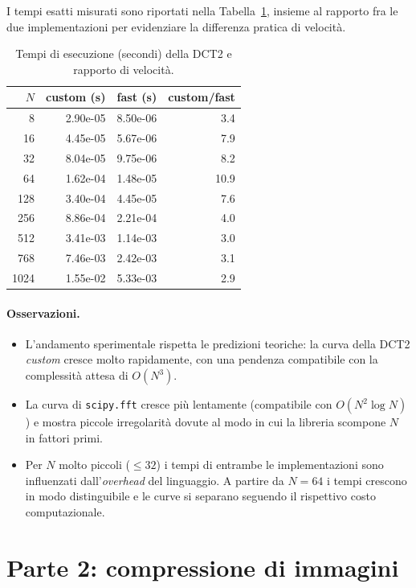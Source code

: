 \documentclass[11pt,a4paper]{article}
\makeatletter
\let\@origtexttt\texttt
\renewcommand{\texttt}[1]{{\def\_{\textunderscore\discretionary{}{}{}}\@origtexttt{#1}}}
\makeatother
\begin{document}
I tempi esatti misurati sono riportati nella Tabella~\ref{tab:tempi}, insieme al
rapporto fra le due implementazioni per evidenziare la differenza pratica di velocità.

\begin{table}[H]
\centering
\caption{Tempi di esecuzione (secondi) della DCT2 e rapporto di velocità.}
\label{tab:tempi}
\begin{tabular}{rrrr}
\toprule
$N$ & custom (s) & fast (s) & custom/fast \\
\midrule
8    & 2.90e-05 & 8.50e-06 & 3.4  \\
16   & 4.45e-05 & 5.67e-06 & 7.9  \\
32   & 8.04e-05 & 9.75e-06 & 8.2  \\
64   & 1.62e-04 & 1.48e-05 & 10.9 \\
128  & 3.40e-04 & 4.45e-05 & 7.6  \\
256  & 8.86e-04 & 2.21e-04 & 4.0  \\
512  & 3.41e-03 & 1.14e-03 & 3.0  \\
768  & 7.46e-03 & 2.42e-03 & 3.1  \\
1024 & 1.55e-02 & 5.33e-03 & 2.9  \\
\bottomrule
\end{tabular}
\end{table}

\paragraph{Osservazioni.}
\begin{itemize}
  \item L'andamento sperimentale rispetta le predizioni teoriche: la curva
        della DCT2 \emph{custom} cresce molto rapidamente, con una pendenza compatibile con la complessità attesa di $O(N^3)$.
  \item La curva di \texttt{scipy.fft} cresce più lentamente (compatibile con
        $O(N^2\log N)$) e mostra piccole irregolarità dovute al modo in cui la libreria scompone $N$ in fattori primi.
  \item Per $N$ molto piccoli ($\le 32$) i tempi di entrambe le implementazioni sono
        influenzati dall'\emph{overhead} del linguaggio. A partire da $N=64$ i tempi crescono in modo distinguibile e le curve si separano seguendo il rispettivo costo computazionale.
\end{itemize}

\section{Parte 2: compressione di immagini}
\end{document}
